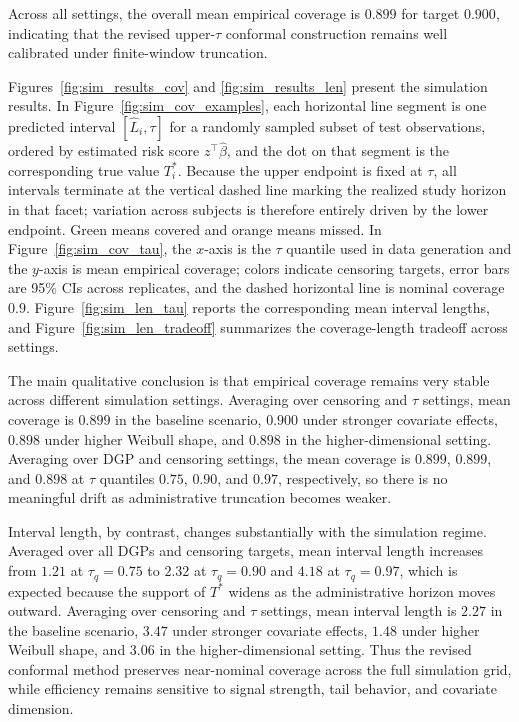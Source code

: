 \documentclass[12pt]{article}
\begin{document}
{\color{revisionblue}
Across all settings, the overall mean empirical coverage is $0.899$ for target
$0.900$, indicating that the revised upper-$\tau$ conformal construction remains
well calibrated under finite-window truncation.

Figures~\ref{fig:sim_results_cov} and \ref{fig:sim_results_len} present the
simulation results. In Figure~\ref{fig:sim_cov_examples}, each horizontal line
segment is one predicted interval $[\widehat L_i,\tau]$ for a randomly sampled
subset of test observations, ordered by estimated risk score $z^\top\widehat\beta$,
and the dot on that segment is the corresponding true value $T_i^*$. Because the
upper endpoint is fixed at $\tau$, all intervals terminate at the vertical dashed
line marking the realized study horizon in that facet; variation across subjects is
therefore entirely driven by the lower endpoint. Green means covered and orange means
missed. In Figure~\ref{fig:sim_cov_tau}, the $x$-axis is the $\tau$ quantile used in
data generation and the $y$-axis is mean empirical coverage; colors indicate
censoring targets, error bars are 95\% CIs across replicates, and the dashed
horizontal line is nominal coverage $0.9$. Figure~\ref{fig:sim_len_tau} reports the
corresponding mean interval lengths, and Figure~\ref{fig:sim_len_tradeoff}
summarizes the coverage-length tradeoff across settings.

The main qualitative conclusion is that empirical coverage remains very stable across different simulation settings. Averaging over censoring and
$\tau$ settings, mean coverage is $0.899$ in the baseline scenario, $0.900$ under
stronger covariate effects, $0.898$ under higher Weibull shape, and $0.898$ in the
higher-dimensional setting. Averaging over DGP and censoring settings, the mean
coverage is $0.899$, $0.899$, and $0.898$ at $\tau$ quantiles $0.75$, $0.90$, and
$0.97$, respectively, so there is no meaningful drift as administrative truncation
becomes weaker.

Interval length, by contrast, changes substantially with the simulation regime.
Averaged over all DGPs and censoring targets, mean interval length increases from
$1.21$ at $\tau_q=0.75$ to $2.32$ at $\tau_q=0.90$ and $4.18$ at $\tau_q=0.97$,
which is expected because the support of $T^*$ widens as the administrative horizon
moves outward. Averaging over censoring and $\tau$ settings, mean interval length is
$2.27$ in the baseline scenario, $3.47$ under stronger covariate effects, $1.48$
under higher Weibull shape, and $3.06$ in the higher-dimensional setting. Thus the
revised conformal method preserves near-nominal coverage across the full simulation
grid, while efficiency remains sensitive to signal strength, tail behavior, and
covariate dimension.
}
\end{document}
